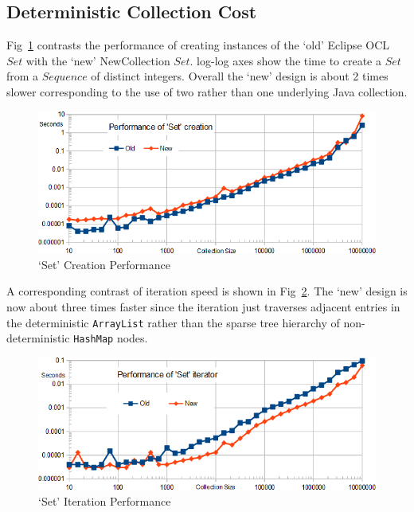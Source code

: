 \documentclass{llncs}
\begin{document}
\subsection{Deterministic Collection Cost}

Fig~\ref{fig:SetCreatePerformance} contrasts the performance of creating instances of the `old' Eclipse OCL $Set$ with the `new' NewCollection $Set$. log-log axes show the time to create a $Set$ from a $Sequence$ of distinct integers. Overall the `new' design is about 2 times slower corresponding to the use of two rather than one underlying Java collection.

\begin{figure}
	\begin{center}
		\includegraphics[width=4.5in]{SetCreatePerformance.png}
	\end{center}
	\caption{`Set' Creation Performance}
	\label{fig:SetCreatePerformance}
\end{figure}

A corresponding contrast of iteration speed is shown in Fig~\ref{fig:SetIteratePerformance}. The `new' design is now about three times faster since the iteration just traverses adjacent entries in the deterministic \verb$ArrayList$ rather than the sparse tree hierarchy of non-deterministic \verb$HashMap$ nodes.

\begin{figure}
	\begin{center}
		\includegraphics[width=4.5in]{SetIteratePerformance.png}
	\end{center}
	\caption{`Set' Iteration Performance}
	\label{fig:SetIteratePerformance}
\end{figure}
\end{document}
